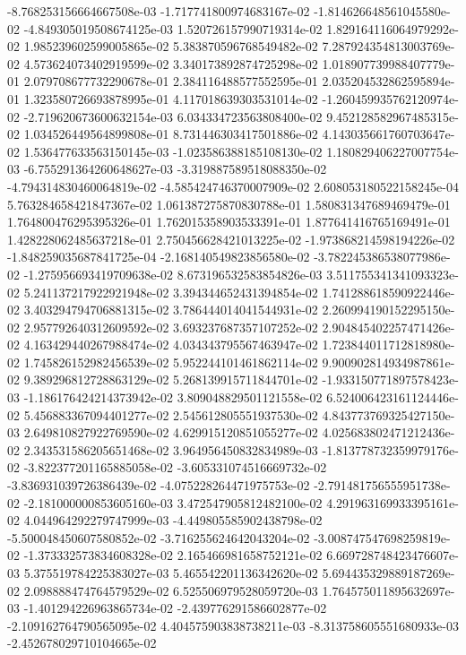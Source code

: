-8.768253156664667508e-03	-1.717741800974683167e-02	-1.814626648561045580e-02	-4.849305019508674125e-03	1.520726157990719314e-02	1.829164116064979292e-02	1.985239602599005865e-02	5.383870596768549482e-02	7.287924354813003769e-02	4.573624073402919599e-02	3.340173892874725298e-02	1.018907739988407779e-01	2.079708677732290678e-01	2.384116488577552595e-01	2.035204532862595894e-01	1.323580726693878995e-01	4.117018639303531014e-02	-1.260459935762120974e-02	-2.719620673600632154e-03	6.034334723563808400e-02	9.452128582967485315e-02	1.034526449564899808e-01	8.731446303417501886e-02	4.143035661760703647e-02	1.536477633563150145e-03	-1.023586388185108130e-02	1.180829406227007754e-03	-6.755291364260648627e-03	-3.319887589518088350e-02	-4.794314830460064819e-02	-4.585424746370007909e-02	2.608053180522158245e-04	5.763284658421847367e-02	1.061387275870830788e-01	1.580831347689469479e-01	1.764800476295395326e-01	1.762015358903533391e-01	1.877641416765169491e-01	1.428228062485637218e-01	2.750456628421013225e-02	-1.973868214598194226e-02	-1.848259035687841725e-04	-2.168140549823856580e-02	-3.782245386538077986e-02	-1.275956693419709638e-02	8.673196532583854826e-03	3.511755341341093323e-02	5.241137217922921948e-02	3.394344652431394854e-02	1.741288618590922446e-02	3.403294794706881315e-02	3.786444014041544931e-02	2.260994190152295150e-02	2.957792640312609592e-02	3.693237687357107252e-02	2.904845402257471426e-02	4.163429440267988474e-02	4.034343795567463947e-02	1.723844011712818980e-02	1.745826152982456539e-02	5.952244101461862114e-02	9.900902814934987861e-02	9.389296812728863129e-02	5.268139915711844701e-02	-1.933150771897578423e-03	-1.186176424214373942e-02	3.809048829501121558e-02	6.524006423161124446e-02	5.456883367094401277e-02	2.545612805551937530e-02	4.843773769325427150e-03	2.649810827922769590e-02	4.629915120851055277e-02	4.025683802471212436e-02	2.343531586205651468e-02	3.964956450832834989e-03	-1.813778732359979176e-02	-3.822377201165885058e-02	-3.605331074516669732e-02	-3.836931039726386439e-02	-4.075228264471975753e-02	-2.791481756555951738e-02	-2.181000000853605160e-03	3.472547905812482100e-02	4.291963169933395161e-02	4.044964292279747999e-03	-4.449805585902438798e-02	-5.500048450607580852e-02	-3.716255624642043204e-02	-3.008747547698259819e-02	-1.373332573834608328e-02	2.165466981658752121e-02	6.669728748423476607e-03	5.375519784225383027e-03	5.465542201136342620e-02	5.694435329889187269e-02	2.098888474764579529e-02	6.525506979528059720e-03	1.764575011895632697e-03	-1.401294226963865734e-02	-2.439776291586602877e-02	-2.109162764790565095e-02	4.404575903838738211e-03	-8.313758605551680933e-03	-2.452678029710104665e-02
